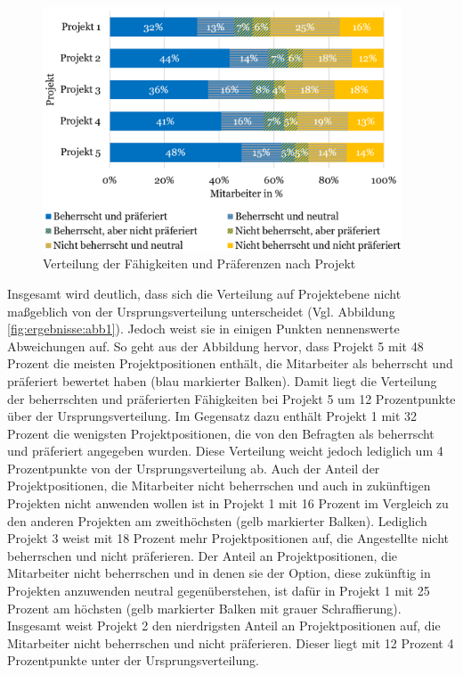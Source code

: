 \begin{figure}
    \centering
	\includegraphics[width=0.95\textwidth]{gfx/verteilung-f-p-nach-projekt.png}
	\caption[Verteilung der Fähigkeiten und Präferenzen nach Projekt]{Verteilung der Fähigkeiten und Präferenzen nach Projekt}
	\label{fig:ergebnisse:abb2}
\end{figure}

Insgesamt wird deutlich, dass sich die Verteilung auf Projektebene nicht maßgeblich von der Ursprungsverteilung unterscheidet (Vgl. Abbildung \ref{fig:ergebnisse:abb1}).
Jedoch weist sie in einigen Punkten nennenswerte Abweichungen auf.
So geht aus der Abbildung hervor, dass Projekt 5 mit 48 Prozent die meisten Projektpositionen enthält, die Mitarbeiter als beherrscht und präferiert bewertet haben (blau markierter Balken).
Damit liegt die Verteilung der beherrschten und präferierten Fähigkeiten bei Projekt 5 um  12 Prozentpunkte über der Ursprungsverteilung.
Im Gegensatz dazu enthält Projekt 1 mit 32 Prozent die wenigsten Projektpositionen, die von den Befragten als beherrscht und präferiert angegeben wurden.
Diese Verteilung weicht jedoch lediglich um 4 Prozentpunkte von der Ursprungsverteilung ab.
Auch der Anteil der Projektpositionen, die Mitarbeiter nicht beherrschen und auch in zukünftigen Projekten nicht anwenden wollen ist in Projekt 1 mit 16 Prozent im Vergleich zu den anderen Projekten am zweithöchsten (gelb markierter Balken).
Lediglich Projekt 3 weist mit 18 Prozent mehr Projektpositionen auf, die Angestellte nicht beherrschen und nicht präferieren.
Der Anteil an Projektpositionen, die Mitarbeiter nicht beherrschen und in denen sie der Option, diese zukünftig in Projekten anzuwenden neutral gegenüberstehen, ist dafür in Projekt 1 mit 25 Prozent am höchsten (gelb markierter Balken mit grauer Schraffierung).
Insgesamt weist Projekt 2 den nierdrigsten Anteil an Projektpositionen auf, die Mitarbeiter nicht beherrschen und nicht präferieren.
Dieser liegt mit 12 Prozent 4 Prozentpunkte unter der Ursprungsverteilung.


